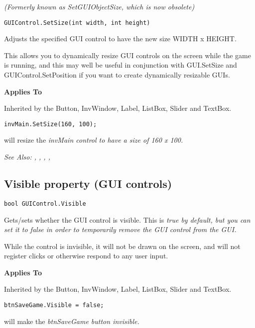 \it{(Formerly known as SetGUIObjectSize, which is now obsolete)}

\begin{verbatim}
GUIControl.SetSize(int width, int height)
\end{verbatim}
Adjusts the specified GUI control to have the new size WIDTH x HEIGHT.

This allows you to dynamically resize GUI controls on the screen while the
game is running, and this may well be useful in conjunction with GUI.SetSize and
GUIControl.SetPosition if you want to create dynamically resizable GUIs.

\bf{Applies To}

Inherited by the Button, InvWindow, Label, ListBox, Slider and TextBox.

\begin{verbatim}
invMain.SetSize(160, 100);
\end{verbatim}
will resize the \it{invMain} control to have a size of 160 x 100.

\it{See Also:} ,
,
,
,


\subsection{Visible property (GUI controls)}\label{GUIControl.Visible}%

\begin{verbatim}
bool GUIControl.Visible
\end{verbatim}
Gets/sets whether the GUI control is visible. This is \it{true} by default, but you
can set it to \it{false} in order to temporarily remove the GUI control from the GUI.

While the control is invisible, it will not be drawn on the screen, and will not register
clicks or otherwise respond to any user input.

\bf{Applies To}

Inherited by the Button, InvWindow, Label, ListBox, Slider and TextBox.

\begin{verbatim}
btnSaveGame.Visible = false;
\end{verbatim}
will make the \it{btnSaveGame} button invisible.

